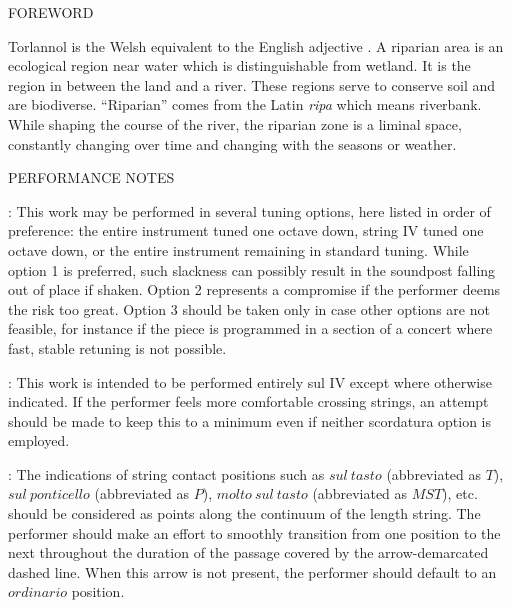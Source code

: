 \documentclass[11pt]{article}
\newcommand*\circled[1]{\tikz[baseline=(char.base)]{
            \node[shape=circle,draw,inner sep=1pt] (char) {#1};}}
\begin{document}
\begin{center}
\huge FOREWORD
\end{center}

\begingroup

\begin{center}
Torlannol is the Welsh equivalent to the English adjective . A riparian area is an ecological region near water which is distinguishable from wetland. It is the region in between the land and a river. These regions serve to conserve soil and are biodiverse. ``Riparian'' comes from the Latin \textit{ripa} which means riverbank. While shaping the course of the river, the riparian zone is a liminal space, constantly changing over time and changing with the seasons or weather.
\rightskip\leftskip
\phantom{text} \hfill \phantom{()}
\end{center}

\endgroup

\vspace*{9\baselineskip}

\begin{center}
\huge PERFORMANCE NOTES
\end{center}

 : This work may be performed in several tuning options, here listed in order of preference: \circled{1} the entire instrument tuned one octave down, \circled{2} string IV tuned one octave down, or \circled{3} the entire instrument remaining in standard tuning. While option 1 is preferred, such slackness can possibly result in the soundpost falling out of place if shaken. Option 2 represents a compromise if the performer deems the risk too great. Option 3 should be taken only in case other options are not feasible, for instance if the piece is programmed in a section of a concert where fast, stable retuning is not possible.
\rightskip\leftskip
\phantom{text} \hfill \phantom{()}

 : This work is intended to be performed entirely sul IV except where otherwise indicated. If the performer feels more comfortable crossing strings, an attempt should be made to keep this to a minimum even if neither scordatura option is employed.
\rightskip\leftskip
\phantom{text} \hfill \phantom{()}

 : The indications of string contact positions such as $sul \ tasto$ (abbreviated as $T$), $sul \ ponticello$ (abbreviated as $P$), $molto \ sul \ tasto$ (abbreviated as $MST$), etc. should be considered as points along the continuum of the length string. The performer should make an effort to smoothly transition from one position to the next throughout the duration of the passage covered by the arrow-demarcated dashed line. When this arrow is not present, the performer should default to an $ordinario$ position.
\rightskip\leftskip
\phantom{text} \hfill \phantom{()}
\end{document}
